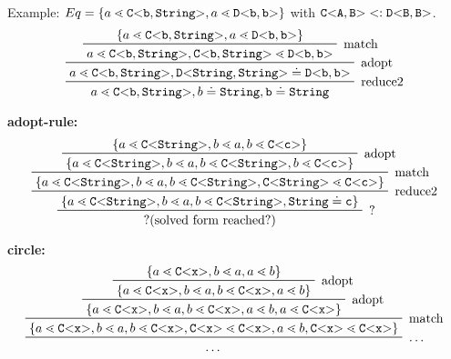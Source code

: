 Example:
$Eq = \{ a \lessdot \mathtt{C {\tt <} b,\tt{String} {\tt >} }, a \lessdot \mathtt{D {\tt <} b,b {\tt >} } \}$
with $\mathtt{C {\tt <} A,B {\tt >} } <: \mathtt{D {\tt <} B,B {\tt >} }$.
\begin{displaymath}
\prftree[r]{
    reduce2
        }{
    \prftree[r]{
        adopt
            }{
    \prftree[r]{
        match
            }{
    \set{a \lessdot \exptype{C}{b,\tt{String}}, a \lessdot \exptype{D}{b,b}}
    }{
    a \lessdot \exptype{C}{b,\tt{String}}, \exptype{C}{b,\tt{String}} \lessdot \exptype{D}{b,b}
    }
    }{
         a \lessdot \exptype{C}{b,\tt{String}}, \exptype{D}{\tt{String},\tt{String}} \doteq \exptype{D}{b,b}
    }}
    {
       a \lessdot \exptype{C}{b,\tt{String}}, b \doteq \tt{String}, b \doteq \tt{String}
        }
\end{displaymath}

\textbf{adopt-rule:}\\
\begin{displaymath}
    \prftree[r]{
        ?
    }{
\prftree[r]{
    reduce2
        }{
    \prftree[r]{
        match
            }{
    \prftree[r]{
        adopt
            }{
    \set{a \lessdot \exptype{C}{\tt{String}}, b \lessdot a, b \lessdot \exptype{C}{c}}
    }{
        \set{a \lessdot \exptype{C}{\tt{String}}, b \lessdot a, b \lessdot \exptype{C}{\tt{String}}, b \lessdot \exptype{C}{c}}
    }
    }{
        \set{a \lessdot \exptype{C}{\tt{String}}, b \lessdot a, b \lessdot \exptype{C}{\tt{String}}, \exptype{C}{\tt{String}} \lessdot \exptype{C}{c}}
    }}
    {
        \set{a \lessdot \exptype{C}{\tt{String}}, b \lessdot a, b \lessdot \exptype{C}{\tt{String}}, \tt{String} \doteq c}
    }}{
    ? \text{(solved form reached?)}
        }
\end{displaymath}


\textbf{circle:}\\
\begin{displaymath}
    \prftree[r]{
        \ldots
    }{
\prftree[r]{
    match
        }{
    \prftree[r]{
        adopt
            }{
    \prftree[r]{
        adopt
            }{
\set{a \lessdot \exptype{C}{x}, b \lessdot a, a \lessdot b}
}{
    \set{a \lessdot \exptype{C}{x}, b \lessdot a, b \lessdot \exptype{C}{x}, a \lessdot b}
}
}{
    \set{a \lessdot \exptype{C}{x}, b \lessdot a, b \lessdot \exptype{C}{x}, a \lessdot b, a \lessdot \exptype{C}{x}}
}}
{
    \set{a \lessdot \exptype{C}{x}, b \lessdot a, b \lessdot \exptype{C}{x}, \exptype{C}{x} \lessdot \exptype{C}{x}, a \lessdot b, \exptype{C}{x} \lessdot \exptype{C}{x}}
}}{
 \ldots
        }
\end{displaymath}

